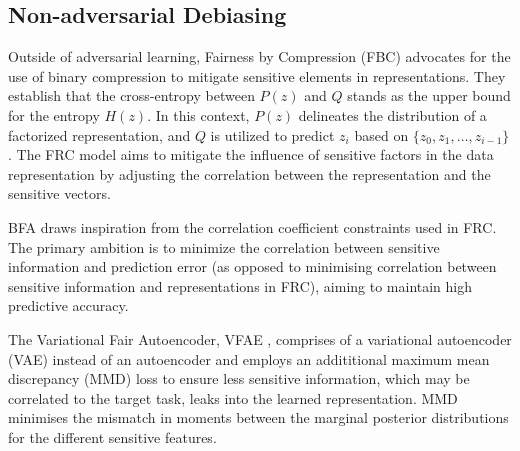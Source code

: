 \subsection{Non-adversarial Debiasing}
Outside of adversarial learning, Fairness by Compression (FBC) \cite{gitiaux2021} advocates for the use of binary compression to mitigate sensitive elements in representations. They establish that the cross-entropy between \( P(z) \) and \( Q \) stands as the upper bound for the entropy \( H(z) \). In this context, \( P(z) \) delineates the distribution of a factorized representation, and \( Q \) is utilized to predict \( z_i \) based on \( \{ z_0, z_1, \dots , z_{i-1} \} \). The FRC model \cite{quan2022} aims to mitigate the influence of sensitive factors in the data representation by adjusting the correlation between the representation and the sensitive vectors.



BFA \cite{quan2023} draws inspiration from the correlation coefficient constraints used in FRC. The primary ambition is to minimize the correlation between sensitive information and prediction error (as opposed to minimising correlation between sensitive information and representations in FRC), aiming to maintain high predictive accuracy.

The Variational Fair Autoencoder, VFAE \cite{louizos2016}, comprises of a variational autoencoder (VAE) instead of an autoencoder and employs an addititional maximum mean discrepancy (MMD) loss to ensure less sensitive information, which may be correlated to the target task, leaks into the learned representation. MMD minimises the mismatch in moments between the marginal posterior distributions for the different sensitive features.


